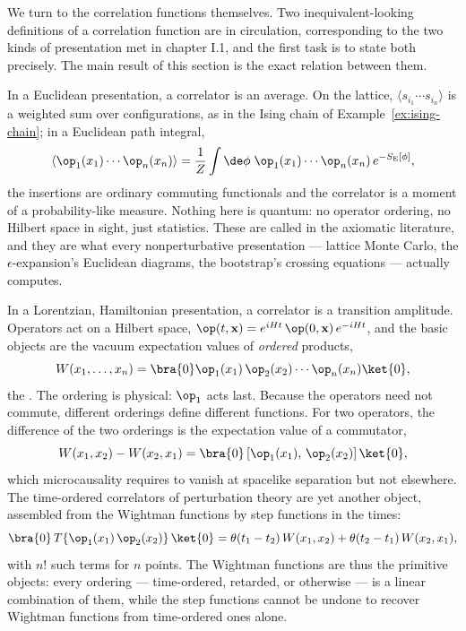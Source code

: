 We turn to the correlation functions themselves. Two inequivalent-looking
definitions of a correlation function are in circulation, corresponding to
the two kinds of presentation met in chapter I.1, and the first task is to
state both precisely. The main result of this section is the exact relation
between them.

In a Euclidean presentation, a correlator is an average. On the lattice,
$\langle s_{i_1} \cdots s_{i_n} \rangle$ is a weighted sum over configurations,
as in the Ising chain of Example~\ref{ex:ising-chain}; in a Euclidean path
integral,
\begin{equation}
\langle \op_1(x_1) \cdots \op_n(x_n) \rangle
= \frac{1}{Z}\int \de\phi \; \op_1(x_1) \cdots \op_n(x_n)\, e^{-S_{\rm E}[\phi]},
\label{eq:euclidean-correlator}
\end{equation}
the insertions are ordinary commuting functionals and the correlator is a
moment of a probability-like measure. Nothing here is quantum: no operator
ordering, no Hilbert space in sight, just statistics. These are called
 in the axiomatic literature, and they are what
every nonperturbative presentation --- lattice Monte Carlo, the
$\epsilon$-expansion's Euclidean diagrams, the bootstrap's crossing equations
--- actually computes.

In a Lorentzian, Hamiltonian presentation, a correlator is a transition
amplitude. Operators act on a Hilbert space, $\op(t,\mathbf{x}) = e^{iHt}\,
\op(0,\mathbf{x})\, e^{-iHt}$, and the basic objects are the vacuum expectation
values of \emph{ordered} products,
\begin{equation}
W(x_1, \dots, x_n) = \bra{0} \op_1(x_1)\, \op_2(x_2) \cdots \op_n(x_n) \ket{0},
\label{eq:wightman-def}
\end{equation}
the . The ordering is physical: $\op_1$ acts last.
Because the operators need not commute, different orderings define
different functions. For two operators, the difference of the two orderings
is the expectation value of a commutator,
\begin{equation}
W(x_1, x_2) - W(x_2, x_1)
= \bra{0}\,[\op_1(x_1),\, \op_2(x_2)]\,\ket{0},
\label{eq:ordering-difference}
\end{equation}
which microcausality requires to vanish at spacelike separation but not
elsewhere. The time-ordered correlators of perturbation theory are yet
another object, assembled from the Wightman functions by step functions in
the times:
\begin{equation}
\bra{0}\, T\{\op_1(x_1)\,\op_2(x_2)\}\,\ket{0}
= \theta(t_1 - t_2)\, W(x_1, x_2) + \theta(t_2 - t_1)\, W(x_2, x_1),
\label{eq:time-ordering}
\end{equation}
with $n!$ such terms for $n$ points. The Wightman functions are thus the
primitive objects: every ordering --- time-ordered, retarded, or otherwise
--- is a linear combination of them, while the step functions cannot be
undone to recover Wightman functions from time-ordered ones alone.

